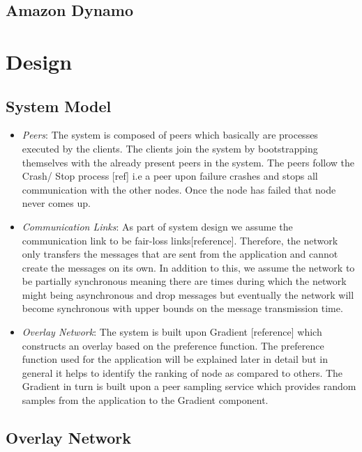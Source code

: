 \documentclass[a4paper, 11pt]{article}
\begin{document}
\subsection*{Amazon Dynamo}




\newpage
\section{Design}


\subsection{System Model}

\begin{itemize}

\item \textit{Peers}: The system is composed of peers which basically are processes executed by the clients. The clients join the system by bootstrapping themselves with the already present peers in the system. The peers follow the Crash/ Stop process [ref] i.e a peer upon failure crashes and stops all communication with the other nodes. Once the node has failed that node never comes up. 


\item \textit{Communication Links}: As part of system design we assume the communication link to be fair-loss links[reference]. Therefore, the network only transfers the messages that are sent from the application and cannot create the messages on its own. In addition to this, we assume the network to be partially synchronous meaning there are times during which the network might being asynchronous and drop messages but eventually the network will become synchronous with upper bounds on the message transmission time.

\item \textit{Overlay Network}: The system is built upon Gradient [reference] which constructs an overlay based on the preference function. The preference function used for the application will be explained later in detail but in general it helps to identify the ranking of node as compared to others. The Gradient in turn is built upon a peer sampling service which provides random samples from the application to the Gradient component.

\end{itemize}



\subsection{Overlay Network}
\end{document}
